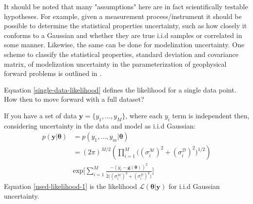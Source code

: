 \begin{tcolorbox}
\begin{multicols}{2}
It should be noted that many "assumptions" here are in fact scientifically testable hypotheses. For example, given a measurement process/instrument it should be possible to determine the statistical properties uncertainty, such as how closely it conforms to a Gaussian and whether they are true i.i.d samples or correlated in some manner. Likewise, the same can be done for modelization uncertainty. One scheme to classify the statistical properties, standard deviation and covariance matrix, of modelization uncertainty in the parameterization of geophysical forward problems is outlined in \citet{afonso2013b}.\par

Equation \ref{single-data-likelihood} defines the likelihood for a single data point. How then to move forward with a full dataset?\par

If you have a set of data $\bm{y} = \{y_1,...,y_M\}$, where each $y_i$ term is independent then, considering uncertainty in the data and model as i.i.d Gaussian:
\begin{equation}
\begin{split}
p(\bm{y}|\bm{\theta}) &= p(y_1,...,y_m|\bm{\theta})\\
&= (2\pi)^{M/2}(\prod_{i = 1}^{M}\big((\sigma^{\mathcal{M}}_i)^2+(\sigma^{\mathcal{D}}_i)^2\big)^{1/2})\\ 
& \text{exp}\bigg[\sum_{i = 1}^{M}\frac{-(y_i-\bm{g}({\bm{\theta}}))^2}{2\big((\sigma^{\mathcal{M}}_i)^2+(\sigma^{\mathcal{D}}_i)^2\big)}\bigg]
\label{used-likelihood-1}
\end{split}
\end{equation}
Equation \ref{used-likelihood-1} is the likelihood $\mathcal{L}(\bm{\theta}|\bm{y})$ for i.i.d Gaussian uncertainty.\par


\end{multicols}
\end{tcolorbox}
